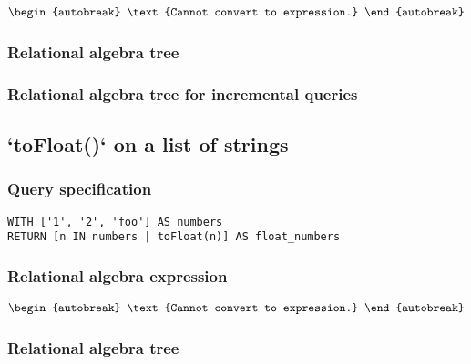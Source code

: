 \begin{align*}
\begin{autobreak}
\text{Cannot convert to expression.}
\end{autobreak}
\end{align*}

\subsubsection*{Relational algebra tree}


\subsubsection*{Relational algebra tree for incremental queries}


\subsection{`toFloat()` on a list of strings}

\subsubsection*{Query specification}

\begin{lstlisting}
WITH ['1', '2', 'foo'] AS numbers
RETURN [n IN numbers | toFloat(n)] AS float_numbers
\end{lstlisting}

\subsubsection*{Relational algebra expression}

\begin{align*}
\begin{autobreak}
\text{Cannot convert to expression.}
\end{autobreak}
\end{align*}

\subsubsection*{Relational algebra tree}


